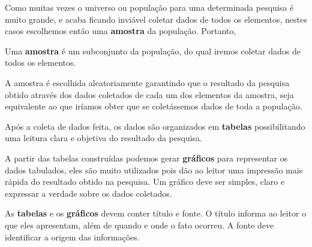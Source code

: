  Como muitas vezes o universo ou população para uma determinada pesquisa é muito grande, e acaba ficando inviável coletar dados de todos os elementos, nestes casos escolhemos então uma \textbf{amostra} da população. Portanto,

  \vskip0.3cm
 \colorbox{azul}{
 \begin{minipage}{13cm}
 \begin{center}
  Uma \textbf{amostra} é um subconjunto da população, do qual iremos coletar dados de todos os elementos.
 \end{center}
 \end{minipage}}
 \vskip0.3cm

 A amostra é escolhida aleatoriamente garantindo que o resultado da pesquisa obtido através dos dados coletados de cada um dos elementos da amostra, seja equivalente ao que iríamos obter que se coletássemos dados de toda a população.

 Após a coleta de dados feita, os dados são organizados em \textbf{tabelas} possibilitando uma leitura clara e objetiva do resultado da pesquisa.

 A partir das tabelas construídas podemos gerar \textbf{gráficos} para representar os dados tabulados, eles são muito utilizados pois dão ao leitor uma impressão mais rápida do resultado obtido na pesquisa. Um gráfico deve ser simples, claro e expressar a verdade sobre os dados coletados.


   \vskip0.3cm
 \colorbox{amarelo}{
 \begin{minipage}{13cm}
 \begin{center}
  As \textbf{tabelas} e os \textbf{gráficos} devem conter título e fonte. O título informa ao leitor o que eles apresentam, além de quando e onde o fato ocorreu. A fonte deve identificar a origem das informações.
 \end{center}
 \end{minipage}}
 \vskip0.3cm
